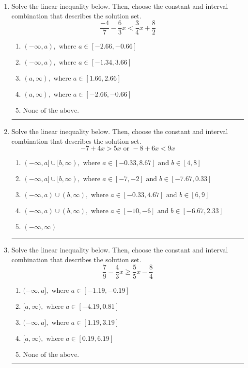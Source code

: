 \documentclass[14pt]{extbook}
\newcommand{\litem}[1]{\item#1\hspace*{-1cm}\rule{\textwidth}{0.4pt}}
\begin{document}
\begin{enumerate}
{\begin{enumerate}[label=\Alph*.]
\end{enumerate} }
\litem{
Solve the linear inequality below. Then, choose the constant and interval combination that describes the solution set.\[ \frac{-4}{7} - \frac{6}{3} x < \frac{3}{4} x + \frac{8}{2} \]\begin{enumerate}[label=\Alph*.]
\item \( (-\infty, a), \text{ where } a \in [-2.66, -0.66] \)
\item \( (-\infty, a), \text{ where } a \in [-1.34, 3.66] \)
\item \( (a, \infty), \text{ where } a \in [1.66, 2.66] \)
\item \( (a, \infty), \text{ where } a \in [-2.66, -0.66] \)
\item \( \text{None of the above}. \)

\end{enumerate} }
\litem{
Solve the linear inequality below. Then, choose the constant and interval combination that describes the solution set.\[ -7 + 4 x > 5 x \text{ or } -8 + 6 x < 9 x \]\begin{enumerate}[label=\Alph*.]
\item \( (-\infty, a] \cup [b, \infty), \text{ where } a \in [-0.33, 8.67] \text{ and } b \in [4, 8] \)
\item \( (-\infty, a] \cup [b, \infty), \text{ where } a \in [-7, -2] \text{ and } b \in [-7.67, 0.33] \)
\item \( (-\infty, a) \cup (b, \infty), \text{ where } a \in [-0.33, 4.67] \text{ and } b \in [6, 9] \)
\item \( (-\infty, a) \cup (b, \infty), \text{ where } a \in [-10, -6] \text{ and } b \in [-6.67, 2.33] \)
\item \( (-\infty, \infty) \)

\end{enumerate} }
\litem{
Solve the linear inequality below. Then, choose the constant and interval combination that describes the solution set.\[ \frac{7}{9} - \frac{4}{3} x \geq \frac{5}{5} x - \frac{8}{4} \]\begin{enumerate}[label=\Alph*.]
\item \( (-\infty, a], \text{ where } a \in [-1.19, -0.19] \)
\item \( [a, \infty), \text{ where } a \in [-4.19, 0.81] \)
\item \( (-\infty, a], \text{ where } a \in [1.19, 3.19] \)
\item \( [a, \infty), \text{ where } a \in [0.19, 6.19] \)
\item \( \text{None of the above}. \)


\end{enumerate}}
\end{enumerate}
\end{document}

